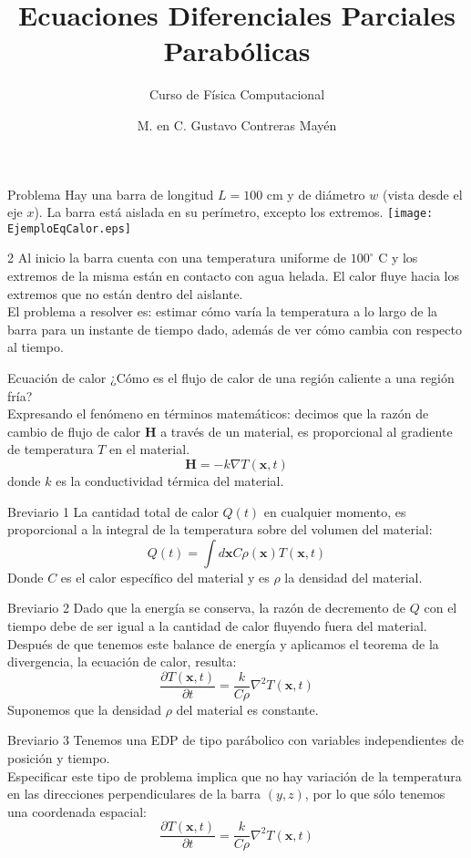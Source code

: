 \documentclass[pdf, blends]{prosper}
\title{Ecuaciones Diferenciales Parciales Parabólicas}
\subtitle{Curso de Física Computacional}
\author{M. en C. Gustavo Contreras Mayén}
\begin{document}
\maketitle
\begin{slide}{Problema}
Hay una barra de longitud $L=100$ cm y de diámetro $w$ (vista desde el eje $x$). La barra está aislada en su perímetro, excepto los extremos.
\texttt{[image: EjemploEqCalor.eps]} 
\end{slide}
\begin{slide}{ 2}
Al inicio la barra cuenta con una temperatura uniforme de $100^{\circ}$ C y los extremos de la misma están en contacto con agua helada. El calor fluye hacia los extremos que no están dentro del aislante.
\\
El problema a resolver es: estimar cómo varía la temperatura a lo largo de la barra para un instante de tiempo dado, además de ver cómo cambia con respecto al tiempo.
\end{slide}
\begin{slide}{Ecuación de calor}
¿Cómo es el flujo de calor de una región caliente a una región fría?
\\
Expresando el fenómeno en términos matemáticos:  decimos que la razón de cambio de flujo de calor $\mathbf{H}$ a través de un material, es proporcional al gradiente de temperatura $T$ en el material.
\[ \mathbf{H} = -k \nabla T(\mathbf{x},t)  \]
donde $k$ es la conductividad térmica del material.
\end{slide}
\begin{slide}{Breviario 1}
La cantidad total de calor $Q(t)$ en cualquier momento, es proporcional a la  integral de la temperatura sobre del volumen del material:
\[ Q(t) = \int d\mathbf{x} C \rho (\mathbf{x}) T(\mathbf{x},t) \]
Donde $C$ es el calor específico del material y es $\rho$ la densidad del material. 
\end{slide}
\begin{slide}{Breviario 2}
Dado que la energía se conserva, la razón de decremento de $Q$ con el tiempo debe de ser igual a la cantidad de calor fluyendo fuera del material. 
\\
Después de que tenemos este balance de energía y aplicamos el teorema de la divergencia, la ecuación de calor, resulta:
\[ \dfrac{\partial T(\mathbf{x},t)}{\partial t} = \dfrac{k}{C \rho} \nabla^{2} T(\mathbf{x},t) \]
Suponemos que la densidad $\rho$ del material es constante.
\end{slide}
\begin{slide}{Breviario 3}
Tenemos una EDP de tipo parábolico con variables independientes de posición y tiempo. 
\\
Especificar este tipo de problema implica que no hay variación de la temperatura en las direcciones perpendiculares de la barra $(y,z)$, por lo que sólo tenemos una coordenada espacial:
\[ \dfrac{\partial T(\mathbf{x},t)}{\partial t} = \dfrac{k}{C \rho} \nabla^{2} T(\mathbf{x},t) \]
\end{slide}
\end{document}
